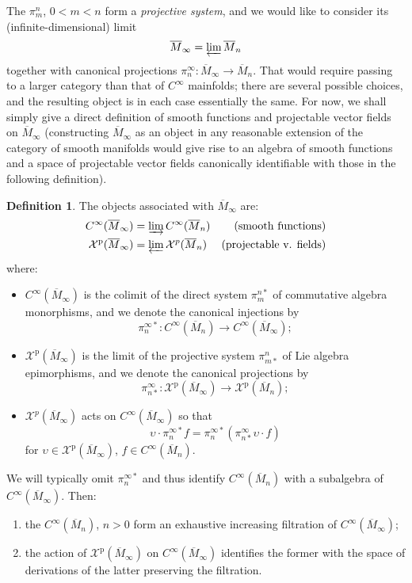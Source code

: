 \documentclass{article}
\def\XX{\mathcal{X}}
\def\p{\mathrm{p}}
\theoremstyle{definition}
\newtheorem{defn}{Definition}
\begin{document}
The $\pi^n_m$, $0 < m < n$ form a \emph{projective system},
and we would like to consider its (infinite-dimensional) limit $$\overline M_\infty = \varprojlim \overline M_n $$
together with
canonical projections $\pi^\infty_n : \overline M_\infty \to \overline M_n$. 
That would require passing to a larger category than that of $C^\infty$ mainfolds;
there are several possible choices, and the resulting object is in each case essentially the
same. 
For now, we shall simply give a direct definition of smooth functions and projectable vector fields
on $\overline M_\infty$
(constructing $\overline M_\infty$ as an object in any reasonable extension of the category of smooth manifolds
would give rise to an algebra of smooth functions and 
a space of projectable vector fields canonically identifiable with those in the following definition).
\begin{defn}
        The objects associated with $\overline M_\infty$ are:
        \begin{align*}
                C^\infty(\overline M_\infty) &= \varinjlim C^\infty(\overline M_n) & \textrm{(smooth functions)} \\
                \XX^\p(\overline M_\infty) &= \varprojlim \XX^p(\overline M_n) & \textrm{(projectable v. fields)}
        \end{align*}
        where:
        \begin{itemize}
\item $C^\infty(\overline M_\infty)$ is the colimit of the direct system  $\pi^{n*}_m$ of 
        commutative algebra monorphisms, and we denote the canonical injections by
        $$\pi^{\infty*}_n : C^\infty(\overline M_n) \to C^\infty(\overline M_\infty);$$
\item $\XX^\p(\overline M_\infty)$ is the limit of the projective system $\pi^n_{m*}$ of
        Lie algebra epimorphisms, and we denote the canonical projections by
        $$ \pi^\infty_{n*}:\XX^\p(\overline M_\infty) \to \XX^\p(\overline M_n);$$
\item $\XX^p(\overline M_\infty)$ acts on $C^\infty(\overline M_\infty)$
        so that $$\upsilon\cdot \pi^{\infty*}_n f = \pi^{\infty*}_n (\pi^\infty_{n*}\upsilon\cdot f)$$
        for $\upsilon \in \XX^\p(\overline M_\infty)$, $f \in C^\infty(\overline M_n)$.
        \end{itemize}
\end{defn}

We will typically omit $\pi^{\infty*}_n$ and thus identify
$C^\infty(\overline M_n)$ with a subalgebra of $C^\infty(\overline M_\infty)$.
Then:\begin{enumerate}
        \item the $C^\infty(\overline M_n)$, $n>0$ form an exhaustive increasing filtration
of $C^\infty(\overline M_\infty)$;
\item the action of $\XX^\p(\overline M_\infty)$ on $C^\infty(\overline M_\infty)$ 
        identifies the former with the space of derivations of the latter preserving the filtration.
\end{enumerate}        
\end{document}
